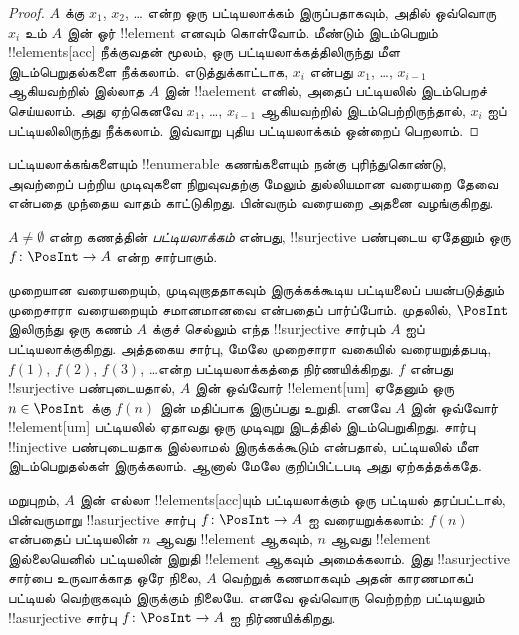 \documentclass[../../../include/open-logic-section]{subfiles}
\begin{document}
\begin{proof}
$A$ க்கு $x_1$, $x_2$, \dots{} என்ற ஒரு பட்டியலாக்கம் இருப்பதாகவும்,
அதில் ஒவ்வொரு $x_i$ உம் $A$ இன் ஓர் !!{element} எனவும் கொள்வோம்.
மீண்டும் இடம்பெறும் !!{element}s[acc] நீக்குவதன் மூலம்,
ஒரு பட்டியலாக்கத்திலிருந்து மீள இடம்பெறுதல்களை நீக்கலாம்.
எடுத்துக்காட்டாக, $x_i$ என்பது $x_1$, \dots, $x_{i-1}$ ஆகியவற்றில்
இல்லாத $A$ இன் !!a{element} எனில், அதைப் பட்டியலில்
இடம்பெறச் செய்யலாம். அது ஏற்கெனவே $x_1$, \dots, $x_{i-1}$
ஆகியவற்றில் இடம்பெற்றிருந்தால், $x_i$ ஐப் பட்டியலிலிருந்து நீக்கலாம்.
இவ்வாறு புதிய பட்டியலாக்கம் ஒன்றைப் பெறலாம்.
\end{proof}

பட்டியலாக்கங்களையும் !!{enumerable} கணங்களையும் நன்கு புரிந்துகொண்டு,
அவற்றைப் பற்றிய முடிவுகளை நிறுவுவதற்கு மேலும் துல்லியமான
வரையறை தேவை என்பதை முந்தைய வாதம் காட்டுகிறது.
பின்வரும் வரையறை அதனை வழங்குகிறது.

\begin{defn}[பட்டியலாக்கம் — முறையான வரையறை]
$A \neq \emptyset$ என்ற கணத்தின் \emph{பட்டியலாக்கம்} என்பது,
!!{surjective} பண்புடைய ஏதேனும் ஒரு
$f \colon \PosInt \to A$ என்ற சார்பாகும்.
\end{defn}

\begin{explain}
முறையான வரையறையும், முடிவுறாததாகவும் இருக்கக்கூடிய பட்டியலைப்
பயன்படுத்தும் முறைசாரா வரையறையும் சமானமானவை என்பதைப் பார்ப்போம்.
முதலில், $\PosInt$ இலிருந்து ஒரு கணம் $A$ க்குச் செல்லும்
எந்த !!{surjective} சார்பும் $A$ ஐப் பட்டியலாக்குகிறது.
அத்தகைய சார்பு, மேலே முறைசாரா வகையில் வரையறுத்தபடி,
$f(1)$, $f(2)$, $f(3)$, \dots என்ற பட்டியலாக்கத்தை நிர்ணயிக்கிறது.
$f$ என்பது !!{surjective} பண்புடையதால்,
$A$ இன் ஒவ்வோர் !!{element}[um] ஏதேனும் ஒரு
$n \in \PosInt$ க்கு $f(n)$ இன் மதிப்பாக இருப்பது உறுதி.
எனவே $A$ இன் ஒவ்வோர் !!{element}[um] பட்டியலில் ஏதாவது ஒரு
முடிவுறு இடத்தில் இடம்பெறுகிறது.
சார்பு !!{injective} பண்புடையதாக இல்லாமல் இருக்கக்கூடும் என்பதால்,
பட்டியலில் மீள இடம்பெறுதல்கள் இருக்கலாம்.
ஆனால் மேலே குறிப்பிட்டபடி அது ஏற்கத்தக்கதே.

மறுபுறம், $A$ இன் எல்லா !!{element}s[acc]யும் பட்டியலாக்கும்
ஒரு பட்டியல் தரப்பட்டால், பின்வருமாறு
!!a{surjective} சார்பு $f\colon \PosInt \to A$ ஐ வரையறுக்கலாம்:
$f(n)$ என்பதைப் பட்டியலின் $n$ ஆவது !!{element} ஆகவும்,
$n$ ஆவது !!{element} இல்லையெனில் பட்டியலின் இறுதி
!!{element} ஆகவும் அமைக்கலாம்.
இது !!a{surjective} சார்பை உருவாக்காத ஒரே நிலை,
$A$ வெற்றுக் கணமாகவும் அதன் காரணமாகப் பட்டியல் வெற்றாகவும்
இருக்கும் நிலையே.
எனவே ஒவ்வொரு வெற்றற்ற பட்டியலும்
!!a{surjective} சார்பு $f\colon \PosInt \to A$ ஐ நிர்ணயிக்கிறது.
\end{explain}
\end{document}
